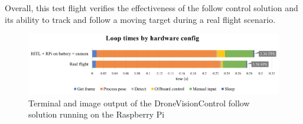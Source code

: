 Overall, this test flight verifies the effectiveness of the follow control solution and its ability to track and follow a moving target during a real flight scenario.


\begin{figure}
  \centering
  \includegraphics[width=\textwidth, keepaspectratio]{img/perf-hitl-flight.png}
  \caption{Terminal and image output of the DroneVisionControl follow solution running on the Raspberry Pi}
  \label{fig:flight-performance}
\end{figure}
